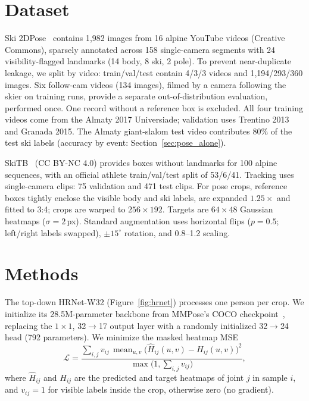 \documentclass{article}
\begin{document}
\section{Dataset}
Ski 2DPose~\cite{bachmann2019motion} contains 1,982 images from 16 alpine YouTube videos (Creative Commons),
sparsely annotated across 158 single-camera segments with 24 visibility-flagged landmarks (14 body, 8 ski, 2 pole).
To prevent near-duplicate leakage, we split by video: train/val/test contain 4/3/3 videos and 1,194/293/360 images.
Six follow-cam videos (134 images), filmed by a camera following the skier on training runs, provide a separate
out-of-distribution evaluation, performed once. One record without a reference box is excluded. All four training videos come from the Almaty 2017 Universiade; validation uses Trentino
2013 and Granada 2015. The Almaty giant-slalom test video contributes 80\% of the test ski labels (accuracy by event:
Section~\ref{sec:pose_alone}).

SkiTB~\cite{dunnhofer2024tracking} (CC BY-NC 4.0) provides boxes without landmarks for 100 alpine sequences, with an
official athlete train/val/test split of 53/6/41. Tracking uses single-camera clips: 75 validation and 471 test
clips. For pose crops, reference
boxes tightly enclose the visible body and ski labels, are expanded $1.25\times$ and fitted to 3:4; crops are warped
to $256\times192$. Targets are $64\times48$ Gaussian heatmaps ($\sigma=2$\,px). Standard augmentation uses horizontal
flips ($p=0.5$; left/right labels swapped), $\pm15^\circ$ rotation, and 0.8--1.2 scaling.

\section{Methods}
The top-down HRNet-W32 (Figure~\ref{fig:hrnet}) processes one person per crop. We initialize its
28.5M-parameter backbone
from MMPose's COCO checkpoint~\cite{mmpose2020,sun2019deep}, replacing the $1\times1$, 32$\to$17 output layer with a
randomly initialized 32$\to$24 head (792 parameters). We minimize the masked heatmap MSE
\[
  \mathcal{L} = \frac{\sum_{i,j} v_{ij}\,\operatorname{mean}_{u,v}\big(\hat H_{ij}(u,v) - H_{ij}(u,v)\big)^2}
                     {\max\big(1, \sum_{i,j} v_{ij}\big)},
\]
where $\hat H_{ij}$ and $H_{ij}$ are the predicted and target heatmaps of joint $j$ in sample $i$, and $v_{ij}=1$ for
visible labels inside the crop, otherwise zero (no gradient).
\end{document}
